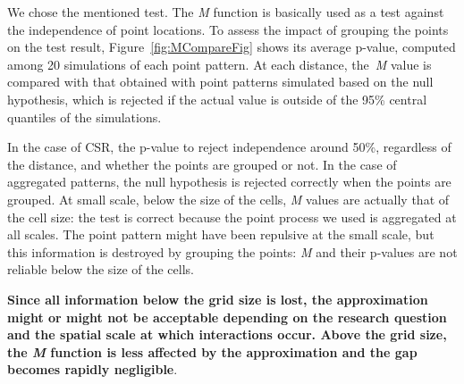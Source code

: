 \documentclass[fleqn,10pt]{latex/stylish_article} %
\begin{document}
\normalsize

We chose the mentioned test.
The \emph{M} function is basically used as a test against the independence of point locations.
To assess the impact of grouping the points on the test result, Figure~\ref{fig:MCompareFig} shows its average p-value, computed among 20 simulations of each point pattern.
At each distance, the~\emph{M} value is compared with that obtained with point patterns simulated based on the null hypothesis, which is rejected if the actual value is outside of the 95\% central quantiles of the simulations.

In the case of CSR, the p-value to reject independence around 50\%, regardless of the distance, and whether the points are grouped or not.
In the case of aggregated patterns, the null hypothesis is rejected correctly when the points are grouped.
At small scale, below the size of the cells, \emph{M} values are actually that of the cell size: the test is correct because the point process we used is aggregated at all scales.
The point pattern might have been repulsive at the small scale, but this information is destroyed by grouping the points: \emph{M} and their p-values are not reliable below the size of the cells.

\textbf{Since all information below the grid size is lost, the approximation might or might not be acceptable depending on the research question and the spatial scale at which interactions occur. Above the grid size, the \emph{M} function is less affected by the approximation and the gap becomes rapidly negligible}.
\end{document}
